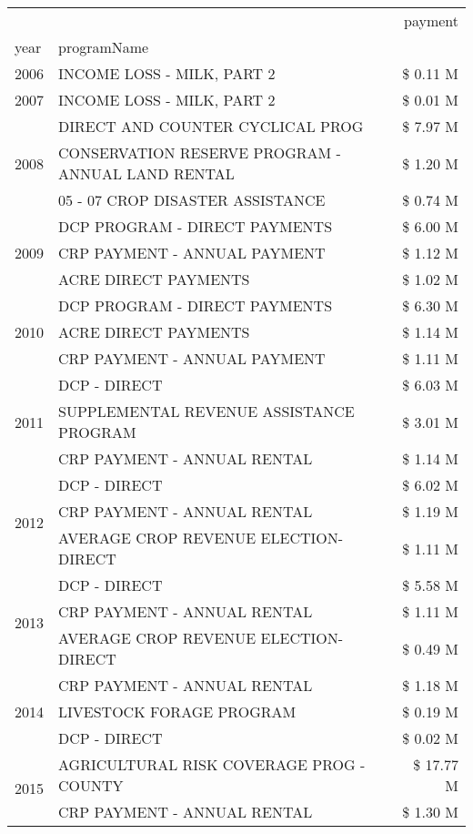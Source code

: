 \begin{tabular}{llr}
\toprule
 &  & payment \\
year & programName &  \\
\midrule
2006 & INCOME LOSS - MILK, PART 2 & \$ 0.11 M \\
\cline{1-3}
2007 & INCOME LOSS - MILK, PART 2 & \$ 0.01 M \\
\cline{1-3}
\multirow[t]{3}{*}{2008} & DIRECT AND COUNTER CYCLICAL PROG & \$ 7.97 M \\
 & CONSERVATION RESERVE PROGRAM - ANNUAL LAND RENTAL & \$ 1.20 M \\
 & 05 - 07 CROP DISASTER ASSISTANCE & \$ 0.74 M \\
\cline{1-3}
\multirow[t]{3}{*}{2009} & DCP PROGRAM - DIRECT PAYMENTS & \$ 6.00 M \\
 & CRP PAYMENT - ANNUAL PAYMENT & \$ 1.12 M \\
 & ACRE DIRECT PAYMENTS & \$ 1.02 M \\
\cline{1-3}
\multirow[t]{3}{*}{2010} & DCP PROGRAM - DIRECT PAYMENTS & \$ 6.30 M \\
 & ACRE DIRECT PAYMENTS & \$ 1.14 M \\
 & CRP PAYMENT - ANNUAL PAYMENT & \$ 1.11 M \\
\cline{1-3}
\multirow[t]{3}{*}{2011} & DCP - DIRECT & \$ 6.03 M \\
 & SUPPLEMENTAL REVENUE ASSISTANCE PROGRAM & \$ 3.01 M \\
 & CRP PAYMENT - ANNUAL RENTAL & \$ 1.14 M \\
\cline{1-3}
\multirow[t]{3}{*}{2012} & DCP - DIRECT & \$ 6.02 M \\
 & CRP PAYMENT - ANNUAL RENTAL & \$ 1.19 M \\
 & AVERAGE CROP REVENUE ELECTION-DIRECT & \$ 1.11 M \\
\cline{1-3}
\multirow[t]{3}{*}{2013} & DCP - DIRECT & \$ 5.58 M \\
 & CRP PAYMENT - ANNUAL RENTAL & \$ 1.11 M \\
 & AVERAGE CROP REVENUE ELECTION-DIRECT & \$ 0.49 M \\
\cline{1-3}
\multirow[t]{3}{*}{2014} & CRP PAYMENT - ANNUAL RENTAL & \$ 1.18 M \\
 & LIVESTOCK FORAGE PROGRAM & \$ 0.19 M \\
 & DCP - DIRECT & \$ 0.02 M \\
\cline{1-3}
\multirow[t]{3}{*}{2015} & AGRICULTURAL RISK COVERAGE PROG - COUNTY & \$ 17.77 M \\
 & CRP PAYMENT - ANNUAL RENTAL & \$ 1.30 M \\

\end{tabular}
